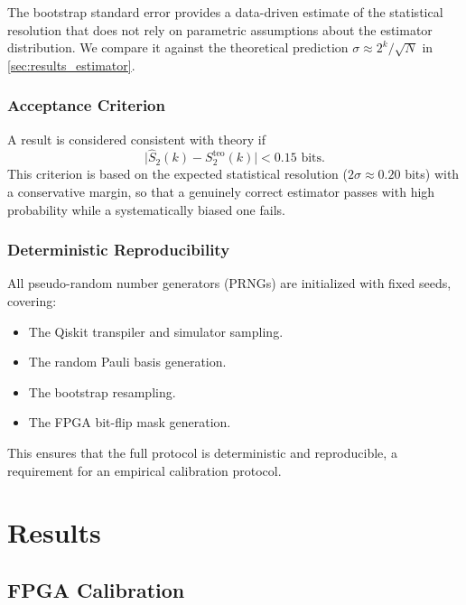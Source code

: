 \documentclass[12pt,a4paper,oneside]{book}
\theoremstyle{plain}
\theoremstyle{definition}
\theoremstyle{remark}
\begin{document}
The bootstrap standard error provides a data-driven estimate of the statistical resolution that does not rely on parametric assumptions about the estimator distribution. We compare it against the theoretical prediction $\sigma \approx 2^k / \sqrt{N}$ in \cref{sec:results_estimator}.

\subsection{Acceptance Criterion}

A result is considered consistent with theory if
\begin{equation}
    \label{eq:acceptance}
    \bigl|\widehat{S}_2(k) - S_2^{\text{teo}}(k)\bigr| < 0.15 \text{ bits}.
\end{equation}
This criterion is based on the expected statistical resolution ($2\sigma \approx 0.20$ bits) with a conservative margin, so that a genuinely correct estimator passes with high probability while a systematically biased one fails.

\subsection{Deterministic Reproducibility}

All pseudo-random number generators (PRNGs) are initialized with fixed seeds, covering:
\begin{itemize}[itemsep=2pt]
    \item The Qiskit transpiler and simulator sampling.
    \item The random Pauli basis generation.
    \item The bootstrap resampling.
    \item The FPGA bit-flip mask generation.
\end{itemize}
This ensures that the full protocol is deterministic and reproducible, a requirement for an empirical calibration protocol.

\chapter{Results}
\label{chap:results}

\section{FPGA Calibration}
\label{sec:results_fpga}
\end{document}
